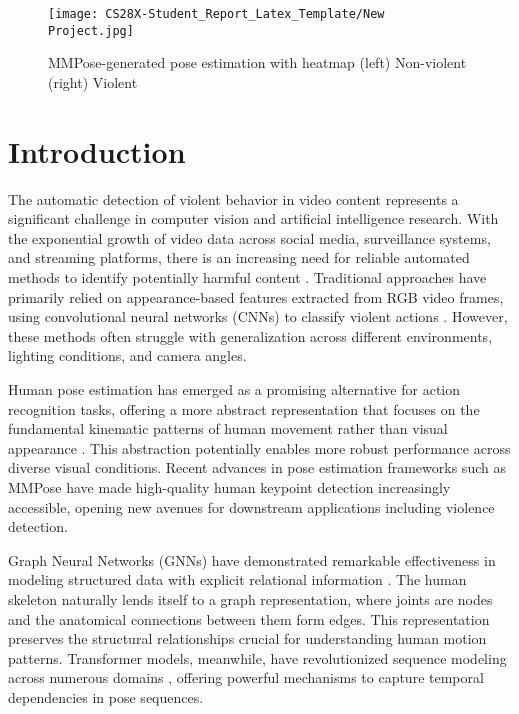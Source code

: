 \documentclass[conference]{IEEEtran}
\begin{document}
\begin{figure*}
    \centering
    \texttt{[image: CS28X-Student\_Report\_Latex\_Template/New Project.jpg]}
    \caption{MMPose-generated pose estimation with heatmap (left) Non-violent (right) Violent}
    \label{fig:enter-label}
\end{figure*}

\section{Introduction}
The automatic detection of violent behavior in video content represents a
significant challenge in computer vision and artificial intelligence research.
With the exponential growth of video data across social media, surveillance
systems, and streaming platforms, there is an increasing need for reliable
automated methods to identify potentially harmful content
\cite{demarty2014violent}. Traditional approaches have primarily relied on
appearance-based features extracted from RGB video frames, using convolutional
neural networks (CNNs) to classify violent actions
\cite{sudhakaran2017learning}. However, these methods often struggle with
generalization across different environments, lighting conditions, and camera
angles.

Human pose estimation has emerged as a promising alternative for action
recognition tasks, offering a more abstract representation that focuses on the
fundamental kinematic patterns of human movement rather than visual appearance
\cite{liu2020disentangling}. This abstraction potentially enables more robust
performance across diverse visual conditions. Recent advances in pose
estimation frameworks such as MMPose \cite{mmpose2020} have made high-quality
human keypoint detection increasingly accessible, opening new avenues for
downstream applications including violence detection.

Graph Neural Networks (GNNs) have demonstrated remarkable effectiveness in
modeling structured data with explicit relational information
\cite{kipf2017semi, velivckovic2018graph}. The human skeleton naturally lends
itself to a graph representation, where joints are nodes and the anatomical
connections between them form edges. This representation preserves the
structural relationships crucial for understanding human motion patterns.
Transformer models, meanwhile, have revolutionized sequence modeling across
numerous domains \cite{vaswani2017attention}, offering powerful mechanisms to
capture temporal dependencies in pose sequences.
\end{document}
